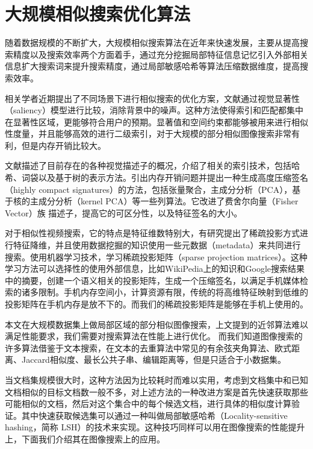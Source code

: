 \section{大规模相似搜索优化算法}

随着数据规模的不断扩大，大规模相似搜索算法在近年来快速发展，主要从提高搜索精度以及搜索效率两个方面着手，通过充分挖掘局部特征信息记忆引入外部相关信息扩大搜索词来提升搜索精度，通过局部敏感哈希等算法压缩数据维度，提高搜索效率\cite{POLICY:2013te}。

相关学者近期提出了不同场景下进行相似搜索的优化方案，文献\cite{Li:2013ks}通过视觉显著性（saliency）模型进行比较，消除背景中的噪声。这种方法使得索引和匹配都集中在显著性区域，更能够符合用户的预期。显著值和空间约束都能够被用来进行相似性度量，并且能够高效的进行二级索引，对于大规模的部分相似图像搜索非常有利，但是内存开销比较大。

文献\cite{Negrel:2013ur}描述了目前存在的各种视觉描述子的概况，介绍了相关的索引技术，包括哈希、词袋以及基于树的表示方法。引出内存开销问题并提出一种生成高度压缩签名（highly compact signatures）的方法，包括张量聚合，主成分分析（PCA），基于核的主成分分析（kernel PCA）等一些列算法。它改进了费舍尔向量（Fisher Vector）族 描述子，提高它的可区分性，以及特征签名的大小。

对于相似性视频搜索，它的特点是特征维数特别大，有研究提出了稀疏投影方式进行特征降维，并且使用数据挖掘的知识使用一些元数据（metadata）来共同进行搜索\cite{Wu:2013tb}。使用机器学习技术，学习稀疏投影矩阵（sparse projection matrices）。这种学习方法可以选择性的使用外部信息，比如WikiPedia上的知识和Google搜索结果中的摘要，创建一个语义相关的投影矩阵，生成一个压缩签名，以满足手机媒体检索的诸多限制。手机内存空间小，计算资源有限，传统的将高维特征映射到低维的投影矩阵在手机内存是放不下的。而我们的稀疏投影矩阵是能够在手机上使用的。

本文在大规模数据集上做局部区域的部分相似图像搜索，上文提到的近邻算法难以满足性能要求，我们需要对搜索算法在性能上进行优化。
而我们知道图像搜索的许多算法借鉴于文本搜索，在文本的去重算法中常见的有余弦夹角算法、欧式距离、Jaccard相似度、最长公共子串、编辑距离等，但是只适合于小数据集。

当文档集规模很大时，这种方法因为比较耗时而难以实用，考虑到文档集中和已知文档相似的目标文档数一般不多，对上述方法的一种改进方案是首先快速获取那些可能相似的文档，然后对这个集合中的每个候选文档，进行具体的相似度计算验证。其中快速获取候选集可以通过一种叫做局部敏感哈希（Locality-sensitive hashing，简称 LSH）的技术来实现。这种技巧同样可以用在图像搜索的性能提升上，下面我们介绍其在图像搜索上的应用。

